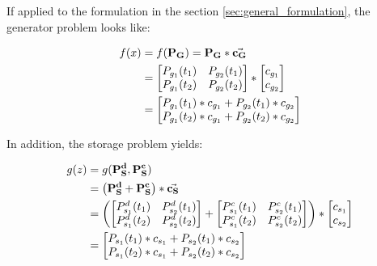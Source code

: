 If applied to the formulation in the section \ref{sec:general_formulation}, the generator problem looks like:

\begin{subequations}
	\begin{align}
		f(x) &= f(\vb{P_G}) = \vb{P_G} * \va{c_G}\\
		& = \begin{bmatrix}
			P_{g_1}(t_1) & P_{g_2}(t_1) \\
			P_{g_1}(t_2) & P_{g_2}(t_2)
		\end{bmatrix} * \begin{bmatrix}
			c_{g_1} \\
			c_{g_2}
		\end{bmatrix} \\
		& = \begin{bmatrix}
			P_{g_1}(t_1) * c_{g_1} + P_{g_2}(t_1) * c_{g_2} \\
			P_{g_1}(t_2) * c_{g_1} + P_{g_2}(t_2) * c_{g_2} \\
		\end{bmatrix}
	\end{align}
\end{subequations}

In addition, the storage problem yields:

\begin{subequations}
	\begin{align}
		g(z) &= g(\vb{P_S^d}, \vb{P_S^c})\\
		& = \left(\vb{P_S^d} + \vb{P_S^c}\right) * \va{c_S} \\
		& = \left(\begin{bmatrix}
			P_{s_1}^d(t_1) & P_{s_2}^d(t_1) \\
			P_{s_1}^d(t_2) & P_{s_2}^d(t_2)
		\end{bmatrix} + \begin{bmatrix}
			P_{s_1}^c(t_1) & P_{s_2}^c(t_1) \\
			P_{s_1}^c(t_2) & P_{s_2}^c(t_2)
		\end{bmatrix} \right) * \begin{bmatrix}
			c_{s_1} \\
			c_{s_2}
		\end{bmatrix} \\
		& = \begin{bmatrix}
			P_{s_1}(t_1) * c_{s_1} + P_{s_2}(t_1) * c_{s_2} \\
			P_{s_1}(t_2) * c_{s_1} + P_{s_2}(t_2) * c_{s_2} \\
		\end{bmatrix}
	\end{align}
\end{subequations}

